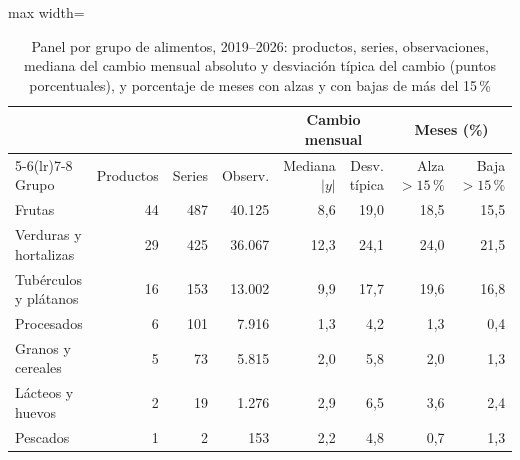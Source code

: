 \begin{table}[htbp]\centering\small
\caption{Panel por grupo de alimentos, 2019--2026: productos, series, observaciones, mediana del cambio mensual absoluto y desviación típica del cambio (puntos porcentuales), y porcentaje de meses con alzas y con bajas de más del 15\,\%}\label{tab:grupos}
\begin{adjustbox}{max width=\textwidth}\begin{tabular}{lrrrrrrr}\toprule
& & & & \multicolumn{2}{c}{Cambio mensual} & \multicolumn{2}{c}{Meses (\%)}\\ \cmidrule(lr){5-6}\cmidrule(lr){7-8}
Grupo & Productos & Series & Observ. & Mediana $|y|$ & Desv. típica & Alza $>15\,\%$ & Baja $>15\,\%$\\ \midrule
Frutas & 44 & 487 & 40.125 & 8{,}6 & 19{,}0 & 18{,}5 & 15{,}5 \\
Verduras y hortalizas & 29 & 425 & 36.067 & 12{,}3 & 24{,}1 & 24{,}0 & 21{,}5 \\
Tubérculos y plátanos & 16 & 153 & 13.002 & 9{,}9 & 17{,}7 & 19{,}6 & 16{,}8 \\
Procesados & 6 & 101 & 7.916 & 1{,}3 & 4{,}2 & 1{,}3 & 0{,}4 \\
Granos y cereales & 5 & 73 & 5.815 & 2{,}0 & 5{,}8 & 2{,}0 & 1{,}3 \\
Lácteos y huevos & 2 & 19 & 1.276 & 2{,}9 & 6{,}5 & 3{,}6 & 2{,}4 \\
Pescados & 1 & 2 & 153 & 2{,}2 & 4{,}8 & 0{,}7 & 1{,}3 \\
\bottomrule\end{tabular}\end{adjustbox}\end{table}
